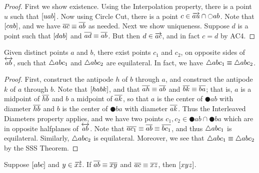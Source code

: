 \begin{proof}
First we show existence.
Using the Interpolation property, there is a point \(u\) such that \([ u a b ]\).
Now using Circle Cut, there is a point \(c \in \overrightarrow{au} \cap \ocircle{ab}\).
Note that \([ c a b ]\), and we have \(\overline{ac} \equiv \overline{ab}\) as needed.
Next we show uniqueness.
Suppose \(d\) is a point such that \([ d a b ]\) and \(\overline{ad} \equiv \overline{ab}\).
But then \(d \in \overrightarrow{ac}\), and in fact \(c = d\) by AC4.
\end{proof}

\begin{construct}
Given distinct points \(a\) and \(b\), there exist points \(c_1\) and \(c_2\), on opposite sides of \(\overleftrightarrow{ab}\), such that \(\bigtriangleup{abc_1}\) and \(\bigtriangleup{abc_2}\) are equilateral.
In fact, we have \(\bigtriangleup{abc_1} \equiv \bigtriangleup{abc_2}\).
\end{construct}

\begin{proof}
First, construct the antipode \(h\) of \(b\) through \(a\), and construct the antipode \(k\) of \(a\) through \(b\).
Note that \([ habk ]\), and that \(\overline{ah} \equiv \overline{ab}\) and \(\overline{bk} \equiv \overline{ba}\); that is, \(a\) is a midpoint of \(\overline{hb}\) and \(b\) a midpoint of \(\overline{ak}\), so that \(a\) is the center of \(\CIRCLE{a}{b}\) with diameter \(\overline{hb}\) and \(b\) is the center of \(\CIRCLE{b}{a}\) with diameter \(\overline{ak}\).
Thus the Interleaved Diameters property applies, and we have two points \(c_1,c_2 \in \CIRCLE{a}{b} \cap \CIRCLE{b}{a}\) which are in opposite halfplanes of \(\overleftrightarrow{ab}\).
Note that \(\overline{ac_1} \equiv \overline{ab} \equiv \overline{bc_1}\), and thus \(\bigtriangleup{abc_1}\) is equilateral.
Similarly, \(\bigtriangleup{abc_2}\) is equilateral.
Moreover, we see that \(\bigtriangleup{abc_1} \equiv \bigtriangleup{abc_2}\) by the SSS Theorem.
\end{proof}

\begin{lem}\label{lem:betweenness-transfer}
Suppose \([ a b c ]\) and \(y \in \overrightarrow{xz}\).
If \(\overline{ab} \equiv \overline{xy}\) and \(\overline{ac} \equiv \overline{xz}\), then \([ x y z ]\).
\end{lem}

